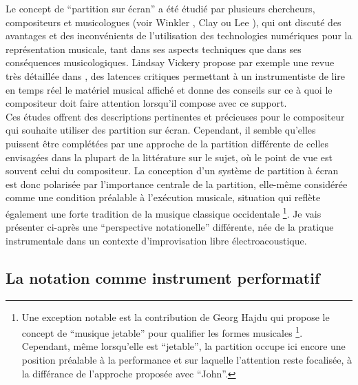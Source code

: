 \indent Le concept de ``partition sur écran'' a été étudié par plusieurs chercheurs, compositeurs et musicologues (voir Winkler \cite{winkler_real-time_2004}, Clay \cite{adams_inventing_2008} ou Lee \cite{lee_real-time_2012}), qui ont discuté des avantages et des inconvénients de l'utilisation des technologies numériques pour la représentation musicale, tant dans ses aspects techniques que dans ses conséquences musicologiques. Lindsay Vickery propose par exemple une revue très détaillée dans \cite{vickery_limitations_2014}, des latences critiques permettant à un instrumentiste de lire en temps réel le matériel musical affiché et donne des conseils sur ce à quoi le compositeur doit faire attention lorsqu'il compose avec ce support.\\
\indent Ces études offrent des descriptions pertinentes et précieuses pour le compositeur qui souhaite utiliser des partition sur écran. Cependant, il semble qu'elles puissent être complétées par une approche de la partition différente de celles envisagées dans la plupart de la littérature sur le sujet, où le point de vue est souvent celui du compositeur. La conception d'un système de partition à écran est donc polarisée par l'importance centrale de la partition, elle-même considérée comme une condition préalable à l'exécution musicale, situation qui reflète également une forte tradition de la musique classique occidentale \footnote{Une exception notable est la contribution de Georg Hajdu \cite{hajdu_disposable_2016} qui propose le concept de ``musique jetable'' pour qualifier les formes musicales \footnote{}. Cependant, même lorsqu'elle est ``jetable'', la partition occupe ici encore une position préalable à la performance et sur laquelle l'attention reste focalisée, à la différance de l'approche proposée avec ``John''.}. Je vais présenter ci-après une ``perspective notationelle'' différente, née de la pratique instrumentale dans un contexte d'improvisation libre électroacoustique.


\subsection{La notation comme instrument performatif}


